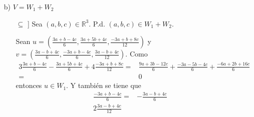 \documentclass[fleqn]{article}
\begin{document}
\begin{enumerate}
\begin{enumerate}
            \item[b)] $ V = W_1 + W_2 $ \par
            
            \begin{enumerate}
                \item[$ \subseteq $]] Sea $ (a,b,c) \in \mathbb{R}^3 $. P.d. $ (a,b,c) \in W_1 + W_2 $. \par
                
                Sean $ u = \left(\frac{3a + b - 4c}{6}, \frac{3a + 5b + 4c}{6}, \frac{-3a + b + 8c}{12} \right) $ y $ v = \left(\frac{3a - b + 4c}{6}, \frac{-3a + b - 4c}{6}, \frac{3a - b + 4c}{12} \right) $. Como
                \begin{align*}
                3 \frac{3a + b - 4c}{6} - \frac{3a + 5b + 4c}{6} + 4 \frac{-3a + b + 8c}{12} =& \frac{9a + 3b - 12c}{6} + \frac{-3a - 5b - 4c}{6} + \frac{-6a + 2b + 16c}{6} \\
                =& 0
                \end{align*}
                entonces $ u \in W_1 $. Y también se tiene que
                \begin{align*}
                \frac{-3a + b - 4c}{6} =& - \frac{3a - b + 4c}{6} \\
                2 \frac{3a - b + 4c}{12}
                \end{align*}


            \end{enumerate}
            
            
            
            
            
            
            
            
            
            
            
            
            
            
            
            
            
            
            
            
            
            
            
            
            
            
            
            
            
            
            
            
            

\end{enumerate}
\end{enumerate}
\end{document}

